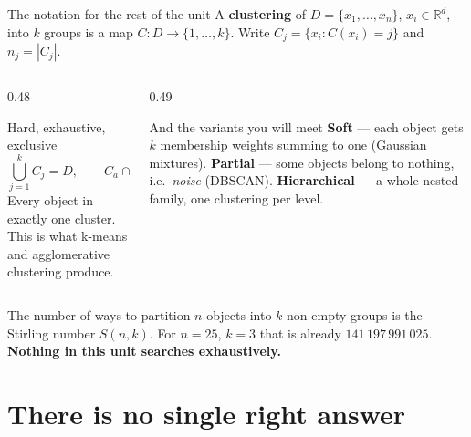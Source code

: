 \documentclass[aspectratio=169]{beamer}
\begin{document}
\begin{frame}[shrink=6]{The notation for the rest of the unit}
  A \textbf{clustering} of $D = \{x_1, \dots, x_n\}$, $x_i \in \mathbb{R}^d$,
  into $k$ groups is a map $C : D \to \{1, \dots, k\}$. Write
  $C_j = \{x_i : C(x_i) = j\}$ and $n_j = |C_j|$.
  \begin{columns}[T]
    \begin{column}{0.48\textwidth}
      \begin{block}{Hard, exhaustive, exclusive}
        \[
          \bigcup_{j=1}^{k} C_j = D, \qquad
          C_a \cap C_b = \varnothing \ \ (a \neq b).
        \]
        Every object in exactly one cluster. This is what k-means and
        agglomerative clustering produce.
      \end{block}
    \end{column}
    \begin{column}{0.49\textwidth}
      \begin{alertblock}{And the variants you will meet}
        \textbf{Soft} --- each object gets $k$ membership weights summing to
        one (Gaussian mixtures). \textbf{Partial} --- some objects belong to
        nothing, i.e.\ \emph{noise} (DBSCAN). \textbf{Hierarchical} --- a
        whole nested family, one clustering per level.
      \end{alertblock}
    \end{column}
  \end{columns}
  \begin{center}\small
    The number of ways to partition $n$ objects into $k$ non-empty groups is
    the Stirling number $S(n,k)$. For $n = 25$, $k = 3$ that is already
    $141\,197\,991\,025$. \textbf{Nothing in this unit searches exhaustively.}
  \end{center}
\end{frame}

\section[Two answers]{There is no single right answer}
\label{sec:noright}
\end{document}
